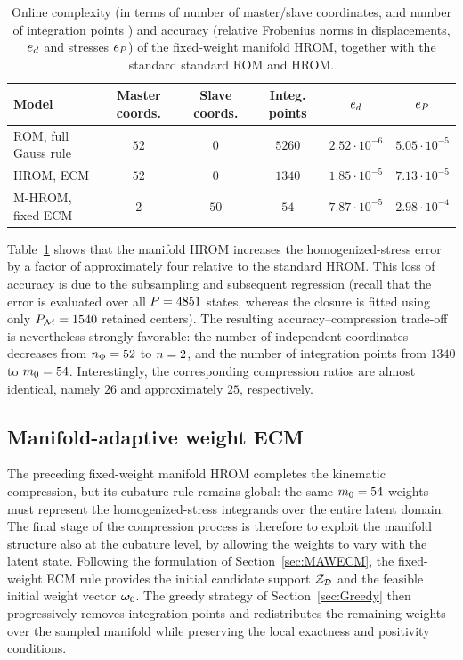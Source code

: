 \documentclass[preprint,10pt]{elsarticle}  %
\begin{document}
\begin{table}[!ht]
\centering
\caption{Online complexity (in terms of number of master/slave coordinates, and number of integration points  ) and accuracy  (relative Frobenius norms in displacements, $e_d$ and stresses $e_P$)  of the fixed-weight manifold
HROM, together with the standard standard ROM and HROM.   }
\label{tab:online_fixed_manifold}
\begin{tabular}{lccccc}
\toprule
Model
& Master coords.
& Slave coords.
& Integ. points
& \(e_d\)
& \(e_P\) \\
\midrule
ROM, full Gauss rule
& \(52\) & \(0\) & \(5260\)
& \(2.52\cdot10^{-6}\)
& \(5.05\cdot10^{-5}\) \\
HROM, ECM
& \(52\) & \(0\) & \(1340\)
& \(1.85\cdot10^{-5}\)
& \(7.13\cdot10^{-5}\) \\
M-HROM, fixed ECM
& \(2\) & \(50\) & \(54\)
& \(7.87\cdot10^{-5}\)
& \(2.98\cdot10^{-4}\) \\
\bottomrule
\end{tabular}
\end{table}

 Table~\ref{tab:online_fixed_manifold} shows that the manifold HROM
increases the homogenized-stress error by a factor of approximately four
relative to the standard HROM. This loss of accuracy is due to the    subsampling and subsequent regression (recall that  the
error is evaluated over all \(P=4851\) states, whereas the closure
is fitted using only \(P_{\mathcal{M}}=1540\) retained centers). The resulting
accuracy--compression trade-off is nevertheless strongly favorable: the number of
independent coordinates decreases from \(n_{\Phi} = 52\) to \(n=2\), and the
number of integration points from \(1340\) to \(m_0 = 54\). Interestingly,
the corresponding compression ratios are almost identical, namely
\(26\) and approximately \(25\), respectively.


\subsection{Manifold-adaptive weight ECM }



The preceding fixed-weight manifold HROM completes the kinematic
compression, but its cubature rule remains global: the same
\(m_0=54\) weights must represent the homogenized-stress integrands
over the entire latent domain. The final stage of the compression
process is therefore to exploit the manifold structure also at the
cubature level, by allowing the weights to vary with the latent state.
Following the formulation of Section~\ref{sec:MAWECM}, the fixed-weight
ECM rule provides the initial candidate support \(\mathcal{Z}_{\mathcal{D}}\) and the feasible
initial weight vector \(\bm{\omega}_0\). The greedy strategy of
Section~\ref{sec:Greedy} then progressively removes integration points
and redistributes the remaining weights over the sampled manifold while
preserving the local exactness and positivity conditions.
\end{document}
